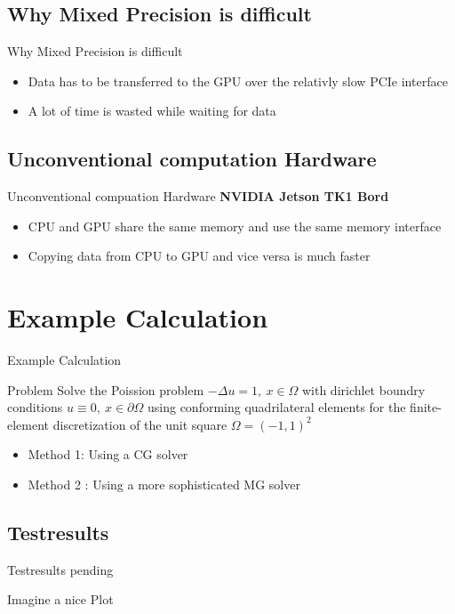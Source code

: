 \documentclass[10pt]{beamer}
\begin{document}
\subsection{Why Mixed Precision is difficult}
\begin{frame}{Why Mixed Precision is difficult}
\begin{itemize}
\item Data has to be transferred to the GPU over the relativly \color{red} slow PCIe \color{black} interface
\item A lot of time is wasted while waiting for data
\end{itemize}
\end{frame}

\subsection{Unconventional computation Hardware}
\begin{frame}{Unconventional compuation Hardware}
\textbf{NVIDIA Jetson TK1 Bord}
\begin{itemize}
\item CPU and GPU share the same memory and use the same memory interface
\item Copying data from CPU to GPU and vice versa is much faster
\end{itemize}
\end{frame}

\section{Example Calculation}
\begin{frame}{Example Calculation}
\begin{block}{Problem}
Solve the Poission problem $- \Delta u = 1,~x\in\Omega$ with dirichlet boundry conditions $u \equiv 0,~x\in \partial \Omega$ using conforming quadrilateral 
elements for the finite-element discretization of the unit square $\Omega = 
(-1,1)^2$
\end{block}

\begin{itemize}
\item Method 1: Using a CG solver
\item Method 2 : Using a more sophisticated MG solver
\end{itemize}

\end{frame}

\subsection{Testresults}
\begin{frame}{Testresults pending}
\begin{center}
\color{red} Imagine a nice Plot\color{black}
\end{center}
\end{frame}
\end{document}
